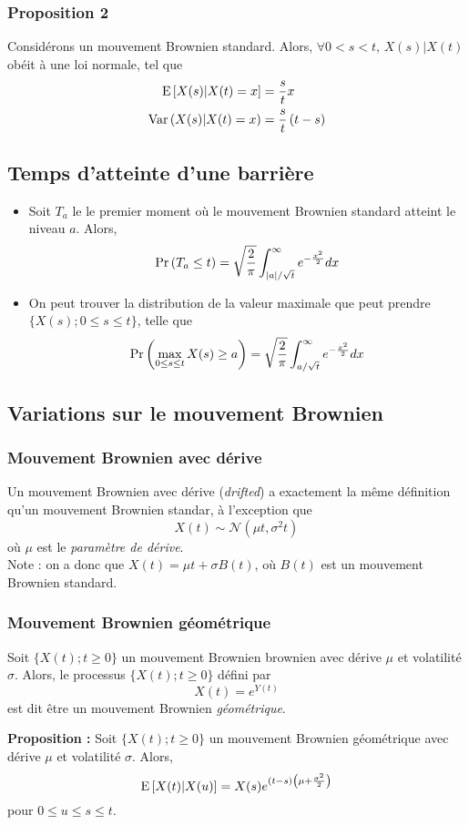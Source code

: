 \documentclass[10pt, french, landscape]{article}
\begin{document}
\begin{multicols*}{2}
\subsubsection*{Proposition 2}
Considérons un mouvement Brownien standard. Alors, $\forall 0 < s < t$, $X(s) | X(t)$ obéit à une loi normale, tel que
\begin{align*}
\mathrm{E} \left[ X(s) | X(t) = x \right]&  = \frac{s}{t} x \\
\mathrm{Var} \left( X(s) |X(t) = x \right) & = \frac{s}{t} \left( t - s \right) \\
\end{align*}

\subsection*{Temps d'atteinte d'une barrière}
\begin{itemize}
\item Soit $T_a$ le le premier moment où le mouvement Brownien standard atteint le niveau $a$. Alors,
\[\Pr \left( T_a \leq t \right) = \sqrt{\frac{2}{\pi}} \int_{|a| / \sqrt{t}}^{\infty} e^{- \frac{x^2}{2}} dx   \]

\item On peut trouver la distribution de la valeur maximale que peut prendre $\{ X(s) ; 0 \leq s \leq t \}$, telle que
\[\Pr \left( \max_{0 \leq s \leq t} X(s) \geq a \right) =  \sqrt{\frac{2}{\pi}} \int_{a / \sqrt{t}}^{\infty} e^{- \frac{x^2}{2}} dx\]
\end{itemize}


\subsection*{Variations sur le mouvement Brownien}
\subsubsection*{Mouvement Brownien avec dérive}
Un mouvement Brownien avec dérive (\emph{drifted}) a exactement la même définition qu'un mouvement Brownien standar, à l'exception que
\[X(t) \sim \mathcal{N} \left(\mu t, \sigma^2 t \right) \]
où $\mu$ est le \emph{paramètre de dérive}.\\
 Note : on a donc que $X(t) = \mu t + \sigma B(t)$, où $B(t)$ est un mouvement Brownien standard.

\subsubsection*{Mouvement Brownien géométrique}
\begin{definition}[Définition]
Soit $\{X(t) ; t \geq 0 \}$ un mouvement Brownien brownien avec dérive $\mu$ et volatilité $\sigma$. Alors, le processus $\{X(t) ; t \geq 0 \}$ défini par
\[X(t) = e^{Y(t)}\]
est dit être un mouvement Brownien \emph{géométrique}.
\end{definition}
\textbf{Proposition : } Soit $\{X(t) ; t \geq 0 \}$ un mouvement Brownien géométrique avec dérive $\mu$ et volatilité $\sigma$. Alors,
\[\mathrm{E} \left[ X(t) | X(u) \right] = X(s) e^{(t-s) \left(\mu + \frac{\sigma^2}{2} \right)} \]
pour $ 0 \leq u \leq s \leq t$.


\end{multicols*}
\end{document}
